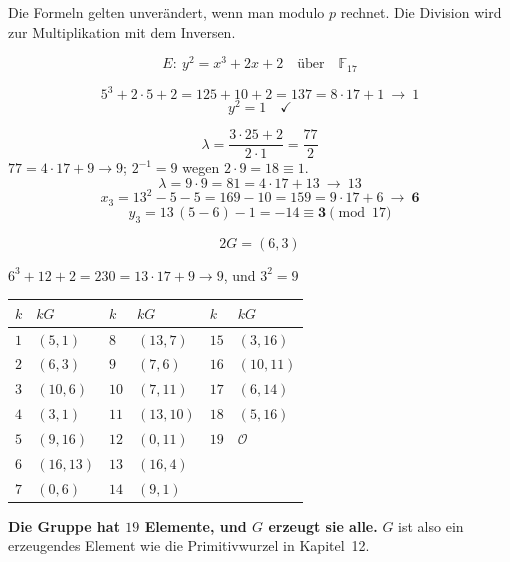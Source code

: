 \begin{merksatz}
Die Formeln gelten unverändert, wenn man modulo $p$ rechnet. Die Division wird zur Multiplikation mit dem Inversen.

\[ E: \ y^{2} = x^{3}+2x+2 \quad\text{über}\quad \mathbb{F}_{17} \]

\[ 5^{3}+2\cdot5+2 = 125+10+2 = 137 = 8\cdot17+1 \ \to\ 1 \]
\[ y^{2} = 1 \quad \checkmark \]

\[ \lambda = \frac{3\cdot25+2}{2\cdot1} = \frac{77}{2} \]
 $77 = 4\cdot17+9 \to 9$; $2^{-1} = 9$ wegen $2\cdot9 = 18 \equiv 1$.
\[ \lambda = 9\cdot9 = 81 = 4\cdot17+13 \ \to\ 13 \]
\[ x_3 = 13^{2}-5-5 = 169-10 = 159 = 9\cdot17+6 \ \to\ \mathbf{6} \]
\[ y_3 = 13\,(5-6)-1 = -14 \equiv \mathbf{3} \pmod{17} \]

\[ 2G = (6,3) \]

 $6^{3}+12+2 = 230 = 13\cdot17+9 \to 9$, und $3^{2} = 9$ \checkmark

\begin{center}
{\small
\renewcommand{\arraystretch}{1.4}
\begin{tabular}{@{}P{1.0cm}P{1.6cm}P{1.0cm}P{1.6cm}P{1.0cm}P{1.6cm}@{}}
\toprule
$k$ & $kG$ & $k$ & $kG$ & $k$ & $kG$\\
\midrule
$1$ & $(5,1)$ & $8$ & $(13,7)$ & $15$ & $(3,16)$\\
$2$ & $(6,3)$ & $9$ & $(7,6)$ & $16$ & $(10,11)$\\
$3$ & $(10,6)$ & $10$ & $(7,11)$ & $17$ & $(6,14)$\\
$4$ & $(3,1)$ & $11$ & $(13,10)$ & $18$ & $(5,16)$\\
$5$ & $(9,16)$ & $12$ & $(0,11)$ & $19$ & $\mathcal{O}$\\
$6$ & $(16,13)$ & $13$ & $(16,4)$ & & \\
$7$ & $(0,6)$ & $14$ & $(9,1)$ & & \\
\bottomrule
\end{tabular}}
\end{center}

\begin{center}
\begin{minipage}{0.9\textwidth}
\textbf{Die Gruppe hat $19$ Elemente, und $G$ erzeugt sie alle.} $G$ ist also ein erzeugendes Element wie die Primitivwurzel in Kapitel~12.
\end{minipage}
\end{center}

\begin{center}
\begin{minipage}{0.88\textwidth}
\end{minipage}
\end{center}
\end{merksatz}

